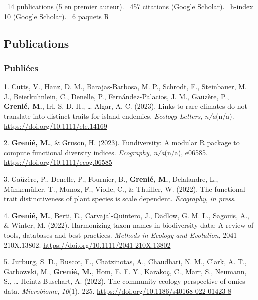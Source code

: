\documentclass[10pt,a4paper,]{article}
\begin{document}
\faFile*~14 publications (5 en premier auteur). \faQuoteLeft~457
citations (Google Scholar). \faHSquare~h-index 10 (Google Scholar).
\faRProject~6 paquets R

\hypertarget{publications}{%
\subsection{Publications}\label{publications}}

\hypertarget{publiuxe9es}{%
\subsubsection{Publiées}\label{publiuxe9es}}

\hypertarget{bibliography}{}
\leavevmode{}%
1. Cutts, V., Hanz, D. M., Barajas-Barbosa, M. P., Schrodt, F.,
Steinbauer, M. J., Beierkuhnlein, C., Denelle, P., Fernández-Palacios,
J. M., Gaüzère, P., \textbf{Grenié, M.}, Irl, S. D. H., \ldots{} Algar,
A. C. (2023). Links to rare climates do not translate into distinct
traits for island endemics. \emph{Ecology Letters}, \emph{n/a}(n/a).
\url{https://doi.org/10.1111/ele.14169}

\leavevmode{}%
2. \textbf{Grenié, M.}, \& Gruson, H. (2023). Fundiversity: A modular R
package to compute functional diversity indices. \emph{Ecography},
\emph{n/a}(n/a), e06585. \url{https://doi.org/10.1111/ecog.06585}

\leavevmode{}%
3. Gaüzère, P., Denelle, P., Fournier, B., \textbf{Grenié, M.},
Delalandre, L., Münkemüller, T., Munoz, F., Violle, C., \& Thuiller, W.
(2022). The functional trait distinctiveness of plant species is scale
dependent. \emph{Ecography}, \emph{in press}.

\leavevmode{}%
4. \textbf{Grenié, M.}, Berti, E., Carvajal-Quintero, J., Dädlow, G. M.
L., Sagouis, A., \& Winter, M. (2022). Harmonizing taxon names in
biodiversity data: A review of tools, databases and best practices.
\emph{Methods in Ecology and Evolution}, 2041--210X.13802.
\url{https://doi.org/10.1111/2041-210X.13802}

\leavevmode{}%
5. Jurburg, S. D., Buscot, F., Chatzinotas, A., Chaudhari, N. M., Clark,
A. T., Garbowski, M., \textbf{Grenié, M.}, Hom, E. F. Y., Karakoç, C.,
Marr, S., Neumann, S., \ldots{} Heintz-Buschart, A. (2022). The
community ecology perspective of omics data. \emph{Microbiome},
\emph{10}(1), 225. \url{https://doi.org/10.1186/s40168-022-01423-8}
\end{document}
